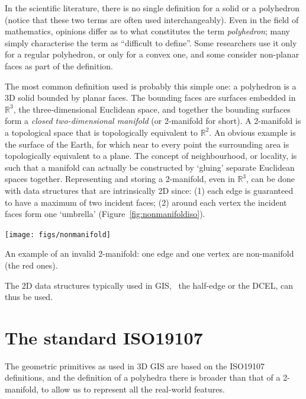 In the scientific literature, there is no single definition for a solid or a polyhedron (notice that these two terms are often used interchangeably).
Even in the field of mathematics, opinions differ as to what constitutes the term \emph{polyhedron}; many simply characterise the term as ``difficult to define''. 
Some researchers use it only for a regular polyhedron, or only for a convex one, and some consider non-planar faces as part of the definition.

%

The most common definition used is probably this simple one: a polyhedron is a 3D solid bounded by planar faces. 
The bounding faces are surfaces embedded in $\mathbb{R}^3$, the three-dimen\-si\-o\-nal Euclidean space, and together the bounding surfaces form a \emph{closed two-dimensional manifold} (or 2-manifold for short).
A 2-manifold is a topological space that is topologically equivalent to $\mathbb{R}^2$. 
An obvious example is the surface of the Earth, for which near to every point the surrounding area is topologically equivalent to a plane. 
The concept of neighbourhood, or locality, is such that a manifold can actually be constructed by `gluing' separate Euclidean spaces together.
Representing and storing a 2-manifold, even in $\mathbb{R}^3$, can be done with data structures that are intrinsically 2D since: (1) each edge is guaranteed to have a maximum of two incident faces; (2) around each vertex the incident faces form one `umbrella' (Figure~\ref{fig:nonmanifoldiso}).
\begin{marginfigure}
  \centering
  \texttt{[image: figs/nonmanifold]}
  \caption{An example of an invalid 2-manifold: one edge and one vertex are non-manifold (the red ones).}%
\label{fig:nonmanifoldiso}
\end{marginfigure}
The 2D data structures typically used in GIS, \eg\ the half-edge or the DCEL, can thus be used.



%
\section{The standard ISO19107}%
\label{sec:19107}

The geometric primitives as used in 3D GIS are based on the ISO19107 definitions, and the definition of a polyhedra there is broader than that of a 2-manifold, to allow us to represent all the real-world features.

